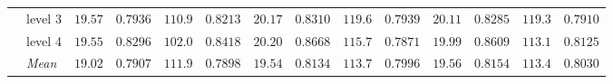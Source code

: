 \begin{table}[htbp]
\begin{tabular}{llrrrrrrrrrrrr}
 & level 3 & {\boldmath$19.57$} & {\boldmath$0.7936$} & {\boldmath$110.9$} & {\boldmath$0.8213$} & $20.17$ & $0.8310$ & $119.6$ & $0.7939$ & $20.11$ & $0.8285$ & $119.3$ & $0.7910$ \\
 & level 4 & {\boldmath$19.55$} & {\boldmath$0.8296$} & {\boldmath$102.0$} & {\boldmath$0.8418$} & $20.20$ & $0.8668$ & $115.7$ & $0.7871$ & $19.99$ & $0.8609$ & $113.1$ & $0.8125$ \\
 & \textit{Mean} & \colorbox{green!20}{\boldmath$19.02$} & \colorbox{green!20}{\boldmath$0.7907$} & \colorbox{green!20}{\boldmath$111.9$} & $0.7898$ & $19.54$ & $0.8134$ & $113.7$ & $0.7996$ & $19.56$ & $0.8154$ & $113.4$ & \colorbox{green!20}{\boldmath$0.8030$} \\
\bottomrule
\end{tabular}
\end{table}
